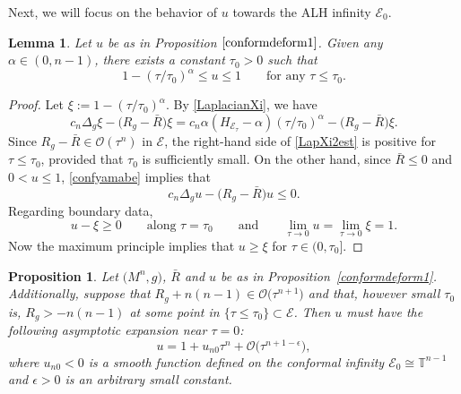 \documentclass[10pt,a4paper]{amsart}
\numberwithin{equation}{section}
\newtheorem{Lemma}[Theorem]{Lemma}
\newtheorem{Prop}[Theorem]{Proposition}
\def\T{\mathbb{T}}
\def\Ecal{\mathcal{E}}
\def\Ocal{\mathcal{O}}
\begin{document}
Next, we will focus on the behavior of $u$
towards the ALH infinity $\Ecal_0$.

\begin{Lemma}\label{conformdeform2}
Let $u$ be as in Proposition $\ref{conformdeform1}$. Given any $\alpha\in (0, n-1)$, there exists a constant $\tau_0>0$ such that
\[
1- (\tau/\tau_0)^\alpha \leq u\leq 1 \qquad \mbox{for any }\tau\leq \tau_0.
\]	
\end{Lemma}

\begin{proof} Let $\xi:= 1 - (\tau/\tau_0)^\alpha$. By \eqref{LaplacianXi}, we have
\begin{equation}\label{LapXi2est}
	c_n\Delta_g \xi - \bigl(R_g - \bar R\bigr)\xi = c_n\alpha (H_{\Ecal_\tau} - \alpha) (\tau/\tau_0)^\alpha - \bigl(R_g - \bar R\bigr)\xi.
\end{equation}
Since $R_g-\bar R\in \Ocal(\tau^{n})$ in $\Ecal$, the right-hand side of \eqref{LapXi2est} is positive for $\tau\le \tau_0$, provided that $\tau_0$ is
sufficiently small.
On the other hand, since $\bar R \le 0$ and $0<u\le 1$, \eqref{confyamabe}
implies that
\begin{equation*}
	c_n \Delta_g u - \bigl(R_g - \bar R\bigr)u  \le 0.
\end{equation*}
Regarding boundary data,
\[
	u - \xi \ge 0 \qquad \mbox{along } \tau = \tau_0
	\qquad\mbox{and}\qquad	\lim_{\tau\rightarrow 0}u= \lim_{\tau\rightarrow 0} \xi = 1.
\]
Now the maximum principle implies that $u\ge \xi$ for $\tau \in (0,\tau_0]$.
\end{proof}

\begin{Prop}\label{behaviornearinfty}
Let $\big(M^n, g\big)$, $\bar R$ and $u$ be as in Proposition~{\rm \ref{conformdeform1}}.
Additionally, suppose that $R_g +n(n-1)\in \Ocal\bigl(\tau^{n+1}\bigr)$ and that, however small $\tau_0$ is, $R_g>-n(n-1)$ at some point in
 $\{\tau\leq \tau_0\}\subset \Ecal$. Then $u$ must have the following asymptotic expansion near $\tau = 0$:
\begin{equation*}%
    u=1+u_{n0}\tau^n+\Ocal\bigl(\tau^{n+1-\epsilon}\bigr),
\end{equation*}
where $u_{n0}<0$ is a smooth function defined on the conformal infinity
$\Ecal_0\cong \T^{n-1}$ and $\epsilon >0$ is an arbitrary small constant.
\end{Prop}
\end{document}
